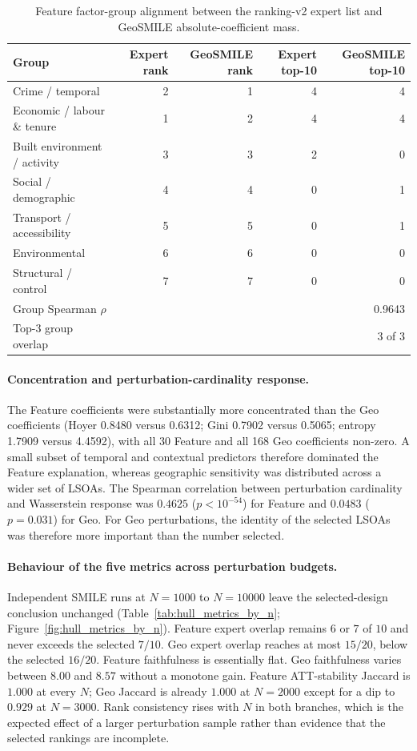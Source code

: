 \begin{table}[H]
\centering
\caption{Feature factor-group alignment between the ranking-v2 expert list and GeoSMILE absolute-coefficient mass.}
\label{tab:hull_factor_group_alignment}
\small
\begin{tabular}{lrrrr}
\toprule
Group & Expert rank & GeoSMILE rank & Expert top-10 & GeoSMILE top-10 \\
\midrule
Crime / temporal & 2 & 1 & 4 & 4 \\
Economic / labour \& tenure & 1 & 2 & 4 & 4 \\
Built environment / activity & 3 & 3 & 2 & 0 \\
Social / demographic & 4 & 4 & 0 & 1 \\
Transport / accessibility & 5 & 5 & 0 & 1 \\
Environmental & 6 & 6 & 0 & 0 \\
Structural / control & 7 & 7 & 0 & 0 \\
\midrule
Group Spearman $\rho$ & \multicolumn{4}{r}{0.9643} \\
Top-3 group overlap & \multicolumn{4}{r}{3 of 3} \\
\bottomrule
\end{tabular}
\end{table}

\paragraph{Concentration and perturbation-cardinality response.}
The Feature coefficients were substantially more concentrated than the Geo coefficients (Hoyer 0.8480 versus 0.6312; Gini 0.7902 versus 0.5065; entropy 1.7909 versus 4.4592), with all 30 Feature and all 168 Geo coefficients non-zero. A small subset of temporal and contextual predictors therefore dominated the Feature explanation, whereas geographic sensitivity was distributed across a wider set of LSOAs. The Spearman correlation between perturbation cardinality and Wasserstein response was $0.4625$ ($p<10^{-54}$) for Feature and $0.0483$ ($p=0.031$) for Geo. For Geo perturbations, the identity of the selected LSOAs was therefore more important than the number selected.

\paragraph{Behaviour of the five metrics across perturbation budgets.}
Independent SMILE runs at $N=1000$ to $N=10000$ leave the selected-design conclusion unchanged (Table~\ref{tab:hull_metrics_by_n}; Figure~\ref{fig:hull_metrics_by_n}). Feature expert overlap remains $6$ or $7$ of $10$ and never exceeds the selected $7/10$. Geo expert overlap reaches at most $15/20$, below the selected $16/20$. Feature faithfulness is essentially flat. Geo faithfulness varies between $8.00$ and $8.57$ without a monotone gain. Feature ATT-stability Jaccard is $1.000$ at every $N$; Geo Jaccard is already $1.000$ at $N=2000$ except for a dip to $0.929$ at $N=3000$. Rank consistency rises with $N$ in both branches, which is the expected effect of a larger perturbation sample rather than evidence that the selected rankings are incomplete.

